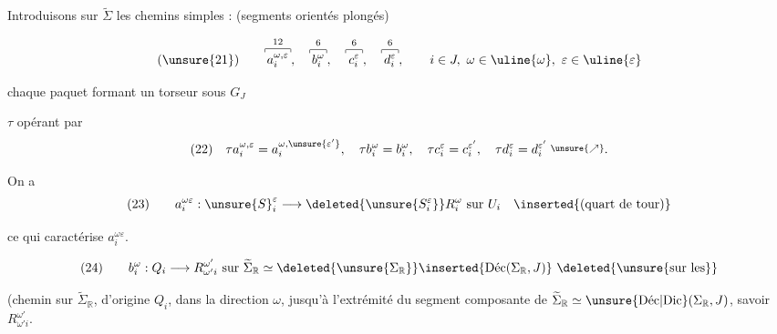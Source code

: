 
Introduisons sur $\widetilde\Sigma$ les  chemins simples : (segments orientés plongés)

\[
(\unsure{21})\qquad\overset{12}{\overset{\rule[-.2ex]{.4pt}{.6ex}\rule[.4ex]{2em}{.4pt}\rule[-.2ex]{.4pt}{.6ex}}{a_i^{\omega,\varepsilon}}},\quad\overset{6}{\overset{\rule[-.2ex]{.4pt}{.6ex}\rule[.4ex]{1.3em}{.4pt}\rule[-.2ex]{.4pt}{.6ex}}{b_i^\omega}},\quad\overset{6}{\overset{\rule[-.2ex]{.4pt}{.6ex}\rule[.4ex]{1.3em}{.4pt}\rule[-.2ex]{.4pt}{.6ex}}{c_i^\varepsilon}},\quad\overset{6}{\overset{\rule[-.2ex]{.4pt}{.6ex}\rule[.4ex]{1.3em}{.4pt}\rule[-.2ex]{.4pt}{.6ex}}{d_i^\varepsilon}},\qquad
i\in J,\ \omega\in\uline{\omega},\ \varepsilon\in\uline{\varepsilon}
\]

chaque paquet  formant un torseur sous $G_J$


$\tau$ opérant par
\[
(22)\quad \tau a_i^{\omega,\varepsilon}=a_i^{\omega,\unsure{\varepsilon'}},\quad
\tau b_i^\omega=b_i^\omega,\quad \tau c_i^\varepsilon=c_i^{\varepsilon'},\quad
\tau d_i^\varepsilon=d_i^{\varepsilon'}\;\raisebox{.4ex}{$\scriptstyle\unsure{\nearrow}$}.
\]

On a
\[
(23)\qquad a_i^{\omega\varepsilon}:{\unsure{S}}_i^\varepsilon\longrightarrow\deleted{\unsure{S_i^\varepsilon}}R_i^\omega\text{ sur }U_i\quad\inserted{(\text{quart de tour})}
\]

ce qui caractérise $a_i^{\omega\varepsilon}$. 

\[
(24)\qquad b_i^\omega:Q_i\longrightarrow R_{\omega'i}^{\omega'}\text{ sur }\widetilde\Sigma_{\mathbb R}\simeq\deleted{\unsure{\Sigma_{\mathbb R}}}\inserted{\operatorname{\text{Déc}}(\Sigma_{\mathbb R},J)}\ \deleted{\unsure{\text{sur les}}}
\]

(chemin sur $\widetilde\Sigma_{\mathbb R}$, d'origine $Q_i$, dans la direction $\omega$, jusqu'à l'extrémité  du segment composante de $\widetilde\Sigma_{\mathbb R}\simeq\operatorname{\text{\unsure{Déc|Dic}}}(\Sigma_{\mathbb R},J)$, savoir $R_{\omega'i}^{\omega'}$.

